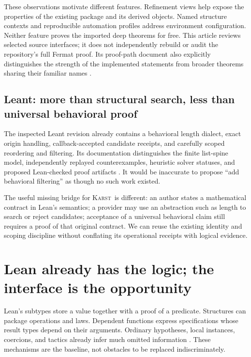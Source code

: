 \documentclass[11pt,letterpaper]{article}
\newcommand{\Karst}{\textsc{Karst}}
\theoremstyle{remark}
\begin{document}
These observations motivate different features. Refinement views help expose
the properties of the existing package and its derived objects. Named
structure contexts and reproducible automation profiles address environment
configuration. Neither feature proves the imported deep theorems for free.
This article reviews selected source interfaces; it does not independently
rebuild or audit the repository's full Fermat proof. Its proof-path document
also explicitly distinguishes the strength of the implemented statements from
broader theorems sharing their familiar names \cite{fltpath}.

\subsection{Leant: more than structural search, less than universal behavioral proof}
The inspected Leant revision already contains a behavioral length dialect,
exact origin handling, callback-accepted candidate receipts, and carefully
scoped reordering and filtering. Its documentation distinguishes the finite
list-spine model, independently replayed counterexamples, heuristic solver
statuses, and proposed Lean-checked proof artifacts \cite{length,verify,postverify}.
It would be inaccurate to propose ``add behavioral filtering'' as though no
such work existed.

The useful missing bridge for \Karst\ is different: an author states a
mathematical contract in Lean's semantics; a provider may use an abstraction
such as length to search or reject candidates; acceptance of a universal
behavioral claim still requires a proof of that original contract. We can reuse
the existing identity and scoping discipline without conflating its operational
receipts with logical evidence.

\section{Lean already has the logic; the interface is the opportunity}\label{sec:existing}

Lean's subtypes store a value together with a proof of a predicate. Structures
can package operations and laws. Dependent functions express specifications
whose result types depend on their arguments. Ordinary hypotheses, local
instances, coercions, and tactics already infer much omitted information
\cite{leansubtypes,leantypes,leanclasses}. These mechanisms are the baseline,
not obstacles to be replaced indiscriminately.
\end{document}
